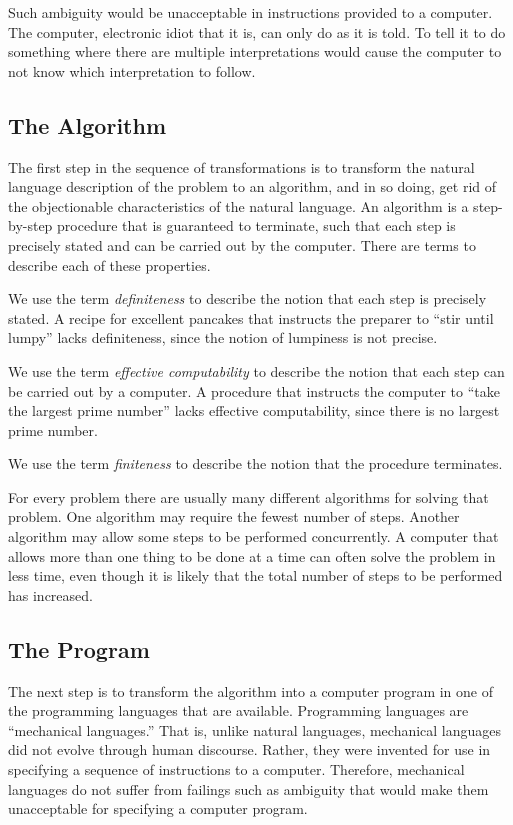 \documentclass{patt}
\begin{document}
Such ambiguity would be unacceptable in instructions provided to a computer.
The computer, electronic idiot that it is, can only do as it is told.  To
tell it to do something where there are multiple interpretations would
cause the computer to not know which interpretation to follow.

\subsection{The Algorithm}

The first step in the sequence of transformations is to transform the
natural language description of the problem to an algorithm, and in so doing,
get rid of the objectionable characteristics of the natural language.  
An algorithm is a
step-by-step procedure that is guaranteed to terminate, such that each step
is precisely stated and can be carried out by the computer.  There
are terms to describe each of these properties.

We use the term {\em definiteness} to describe the notion that each step is
precisely stated.  A recipe for excellent pancakes that instructs the
preparer to ``stir until lumpy'' lacks definiteness, since the notion of
lumpiness is not precise.

We use the term {\em effective computability} to describe the notion that
each step can be carried out by a computer.  A procedure that instructs
the computer to ``take the largest prime number'' lacks effective computability,
since there is no largest prime number.

We use the term  {\em finiteness} to describe the notion that the procedure
terminates.

For every problem there are usually many different algorithms for
solving that problem.  One algorithm may require the fewest number of
steps.  Another algorithm may allow some steps to be performed concurrently.
A computer that allows more than one thing to be done at a time
can often solve the problem in less time, even though it is
likely that the total number of steps to be performed has increased.

\enlargethispage{-1pc}

\subsection{The Program}

The next step is to transform the algorithm into a computer program in one
of the programming languages that are available.  Programming languages are
``mechanical languages.''  That is, unlike natural languages, mechanical
languages did
not evolve through human discourse.  Rather, they were invented for use in
specifying a sequence of instructions to a computer.  Therefore,
mechanical languages do not suffer from failings such as ambiguity that would
make them unacceptable for specifying a computer program.
\end{document}
